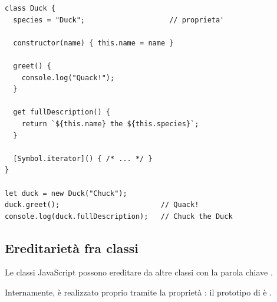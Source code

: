 \begin{affianco}[0.5][c]
\begin{lstlisting}[style=js, name=classi-props.js]
class Duck {
  species = "Duck";                    // proprieta'

  constructor(name) { this.name = name }

  greet() {
    console.log("Quack!");
  }

  get fullDescription() {
    return `${this.name} the ${this.species}`;
  }

  [Symbol.iterator]() { /* ... */ }
}

let duck = new Duck("Chuck");
duck.greet();                        // Quack!
console.log(duck.fullDescription);   // Chuck the Duck
\end{lstlisting}
\risultato
\begin{immagine}
\end{immagine}
\end{affianco}

\subsection{Ereditarietà fra classi}

Le classi JavaScript possono ereditare da altre classi con la parola chiave
.

Internamente,  è realizzato proprio tramite la proprietà
\code{[[Prototype]]}: il prototipo di  è
.

